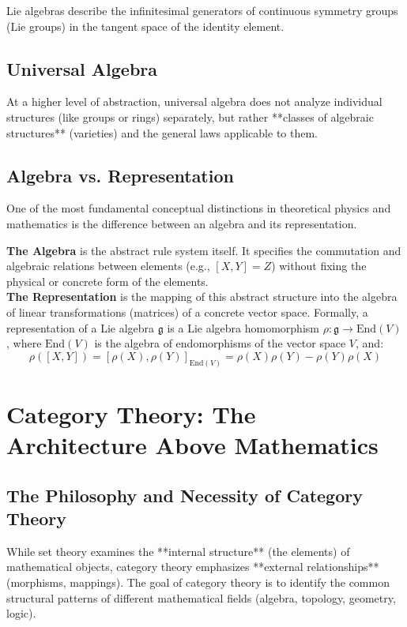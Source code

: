 \documentclass[11pt,a4paper,oneside]{book}
\theoremstyle{definition}
\theoremstyle{plain}
\newcommand{\End}{\text{End}}
\newcommand{\Lie}{\mathfrak{g}}
\begin{document}
Lie algebras describe the infinitesimal generators of continuous symmetry groups (Lie groups) in the tangent space of the identity element.

\section{Universal Algebra}
At a higher level of abstraction, universal algebra does not analyze individual structures (like groups or rings) separately, but rather **classes of algebraic structures** (varieties) and the general laws applicable to them.

\section{Algebra vs. Representation}
One of the most fundamental conceptual distinctions in theoretical physics and mathematics is the difference between an algebra and its representation.

\begin{insightbox}
\textbf{The Algebra} is the abstract rule system itself. It specifies the commutation and algebraic relations between elements (e.g., $[X, Y] = Z$) without fixing the physical or concrete form of the elements.\\[0.5em]
\textbf{The Representation} is the mapping of this abstract structure into the algebra of linear transformations (matrices) of a concrete vector space.
Formally, a representation of a Lie algebra $\Lie$ is a Lie algebra homomorphism $\rho: \Lie \to \End(V)$, where $\End(V)$ is the algebra of endomorphisms of the vector space $V$, and:
\[ \rho([X,Y]) = [\rho(X), \rho(Y)]_{\End(V)} = \rho(X)\rho(Y) - \rho(Y)\rho(X) \]
\end{insightbox}


\chapter{Category Theory: The Architecture Above Mathematics}

\section{The Philosophy and Necessity of Category Theory}
While set theory examines the **internal structure** (the elements) of mathematical objects, category theory emphasizes **external relationships** (morphisms, mappings). The goal of category theory is to identify the common structural patterns of different mathematical fields (algebra, topology, geometry, logic).
\end{document}
